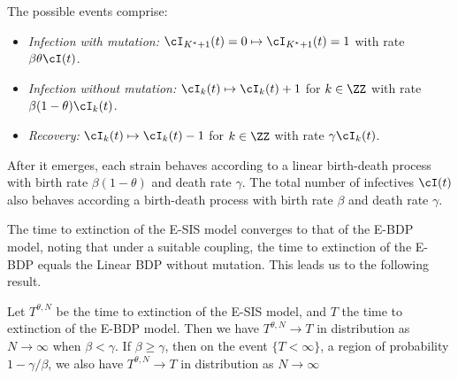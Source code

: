 \documentclass[review]{elsarticle}
\begin{document}
The possible events comprise:
\begin{itemize}
	\item \emph{Infection with mutation:} $\cI_{K^* + 1}(t)=0 \mapsto \cI_{K^* + 1}(t)=1$
	with rate $\beta \theta \cI(t)$.
	\item \emph{Infection without mutation:} $\cI_k(t) \mapsto \cI_k(t) + 1$
	for $k \in \ZZ$ with rate  \mbox{$\beta(1-\theta)\cI_k(t)$}.	
	\item \emph{Recovery:}  $\cI_k(t) \mapsto \cI_k(t) - 1$
	for $k \in \ZZ$ with rate $\gamma \cI_k(t)$.
	
\end{itemize}

After it emerges, each strain behaves according to a linear birth-death process with birth rate $\beta(1-\theta)$ and death rate $\gamma$. The total number of infectives $\cI(t)$ also behaves according a birth-death process with birth rate $\beta$ and death rate $\gamma$.

The time to extinction of the E-SIS model converges to that of the E-BDP model, noting that under a suitable coupling, the time to extinction of the E-BDP equals the Linear BDP without mutation. This leads us to the following result.
\begin{mythm}
	Let $T^{\theta,N}$ be the time to extinction of the E-SIS model, and $T$ the time to extinction of the E-BDP model. Then we have $T^{\theta,N} \rightarrow T$ in distribution as $N \rightarrow \infty$ when $\beta < \gamma$. If $\beta \geq \gamma$, then on the event $\{T < \infty\}$, a region of probability $1 - \gamma/\beta$, we also have $T^{\theta,N} \rightarrow T$ in distribution as $N \rightarrow \infty$
\end{mythm}
\end{document}
